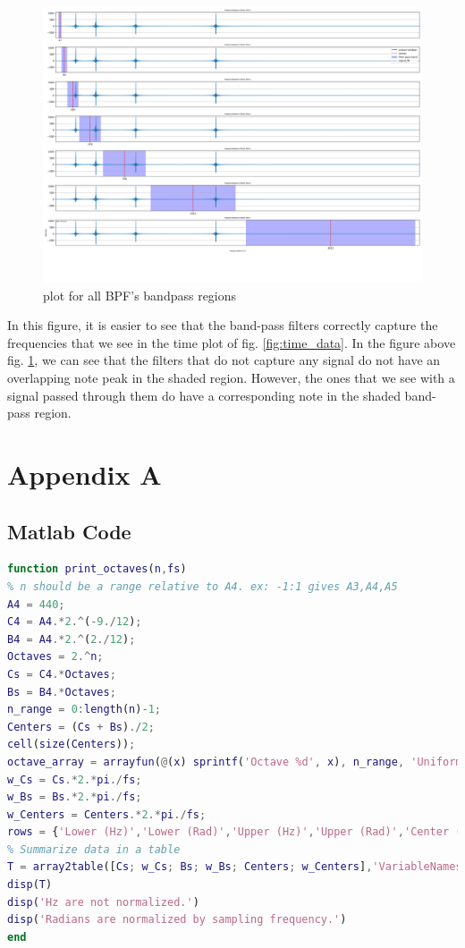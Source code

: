 \documentclass[a4paper, 11pt]{exam}
\begin{document}
\begin{figure}[h!]
  \centering
  \hspace*{-1.5cm}\includegraphics[width=17cm]{../fft_freqdata.png}
  \caption{plot for all BPF's bandpass regions}
  \label{fig:bandpass_regions}
\end{figure}
In this figure, it is easier to see that the band-pass filters correctly capture the frequencies that we see in the time plot of fig. \ref{fig:time_data}. In the figure above fig. \ref{fig:bandpass_regions}, we can see that the filters that do not capture any signal do not have an overlapping note peak in the shaded region. However, the ones that we see with a signal passed through them do have a corresponding note in the shaded band-pass region. 
\newpage
\section*{Appendix A}
\subsection{Matlab Code}
\begin{lstlisting}[language=Matlab]
function print_octaves(n,fs)
% n should be a range relative to A4. ex: -1:1 gives A3,A4,A5
A4 = 440;
C4 = A4.*2.^(-9./12);
B4 = A4.*2.^(2./12);
Octaves = 2.^n;
Cs = C4.*Octaves;
Bs = B4.*Octaves;
n_range = 0:length(n)-1;
Centers = (Cs + Bs)./2;
cell(size(Centers));
octave_array = arrayfun(@(x) sprintf('Octave %d', x), n_range, 'UniformOutput', false);
w_Cs = Cs.*2.*pi./fs;
w_Bs = Bs.*2.*pi./fs;
w_Centers = Centers.*2.*pi./fs;
rows = {'Lower (Hz)','Lower (Rad)','Upper (Hz)','Upper (Rad)','Center (Hz)','Center (Rad)'};
% Summarize data in a table
T = array2table([Cs; w_Cs; Bs; w_Bs; Centers; w_Centers],'VariableNames',octave_array,'RowName',rows);
disp(T)
disp('Hz are not normalized.')
disp('Radians are normalized by sampling frequency.')
end 
\end{lstlisting}
\end{document}
